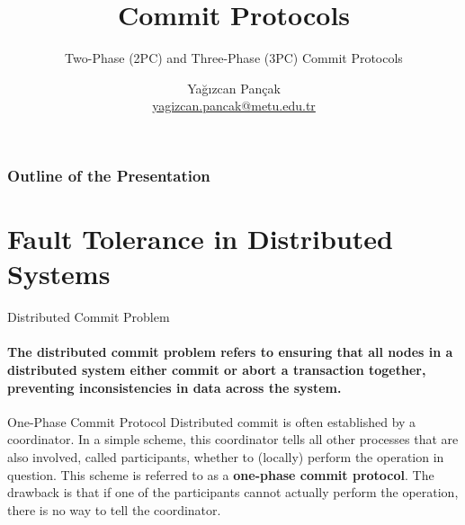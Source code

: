 \documentclass[11pt]{beamer}              %
\author[Yağızcan Pançak]{Yağızcan Pançak\\\href{mailto:yagizcan.pancak@metu.edu.tr}{yagizcan.pancak@metu.edu.tr}}
\title[Commit Protocols]{Commit Protocols}
\subtitle[SubTitle]{Two-Phase (2PC) and Three-Phase (3PC) Commit Protocols}
\begin{document}
\begin{frame}[plain]
\titlepage
{}
\end{frame}

\begin{frame}[label=toc]
    \frametitle{Outline of the Presentation}
    \tableofcontents[subsubsectionstyle=hide]
\end{frame}
%
%
\section{Fault Tolerance in Distributed Systems}

\begin{frame}{Distributed Commit Problem}
\framesubtitle{The distributed commit problem refers to ensuring that all nodes in a distributed system either commit or abort a transaction together, preventing inconsistencies in data across the system.}
\begin{block}{One-Phase Commit Protocol} 
Distributed commit is often established by a coordinator. In a simple
scheme, this coordinator tells all other processes that are also involved, called
participants, whether to (locally) perform the operation in question. This
scheme is referred to as a \textbf{one-phase commit protocol}. The drawback is that if one of the participants cannot actually perform the operation,
there is no way to tell the coordinator.
\end{block}
\note{}
\end{frame}
\end{document}

